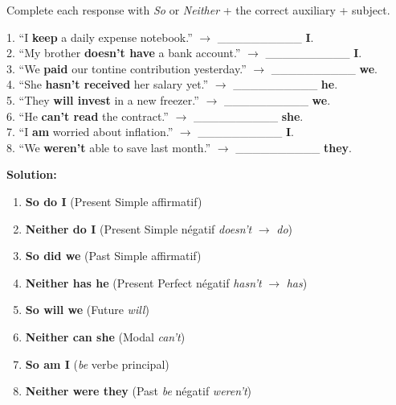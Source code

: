\documentclass[11pt]{article}
\begin{document}
\begin{exoresolu}
Complete each response with \emph{So} or \emph{Neither} + the correct auxiliary + subject.

1. ``I \textbf{keep} a daily expense notebook.'' $\rightarrow$ \_\_\_\_\_\_\_\_\_\_ \textbf{I}. \\
2. ``My brother \textbf{doesn't have} a bank account.'' $\rightarrow$ \_\_\_\_\_\_\_\_\_\_ \textbf{I}. \\
3. ``We \textbf{paid} our tontine contribution yesterday.'' $\rightarrow$ \_\_\_\_\_\_\_\_\_\_ \textbf{we}. \\
4. ``She \textbf{hasn't received} her salary yet.'' $\rightarrow$ \_\_\_\_\_\_\_\_\_\_ \textbf{he}. \\
5. ``They \textbf{will invest} in a new freezer.'' $\rightarrow$ \_\_\_\_\_\_\_\_\_\_ \textbf{we}. \\
6. ``He \textbf{can't read} the contract.'' $\rightarrow$ \_\_\_\_\_\_\_\_\_\_ \textbf{she}. \\
7. ``I \textbf{am} worried about inflation.'' $\rightarrow$ \_\_\_\_\_\_\_\_\_\_ \textbf{I}. \\
8. ``We \textbf{weren't} able to save last month.'' $\rightarrow$ \_\_\_\_\_\_\_\_\_\_ \textbf{they}.

\medskip
\textbf{Solution:}
\begin{enumerate}
\item \textbf{So do I} (Present Simple affirmatif)
\item \textbf{Neither do I} (Present Simple négatif \emph{doesn't} $\rightarrow$ \emph{do})
\item \textbf{So did we} (Past Simple affirmatif)
\item \textbf{Neither has he} (Present Perfect négatif \emph{hasn't} $\rightarrow$ \emph{has})
\item \textbf{So will we} (Future \emph{will})
\item \textbf{Neither can she} (Modal \emph{can't})
\item \textbf{So am I} (\emph{be} verbe principal)
\item \textbf{Neither were they} (Past \emph{be} négatif \emph{weren't})
\end{enumerate}
\end{exoresolu}
\end{document}

